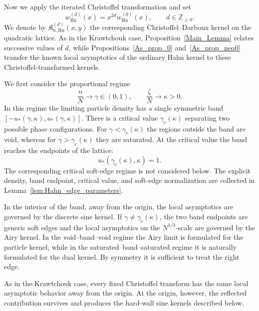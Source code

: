 \documentclass[reqno,11pt]{amsart}
\newcommand{\ZZ}{\mathbb{Z}}
\theoremstyle{plain}
\theoremstyle{definition}
\numberwithin{equation}{section}
\begin{document}
Now we apply the iterated Christoffel transformation and set
\[
w_{\mathrm{Hn}}^{(d)}(x) = x^{2d}w_{\mathrm{Hn}}^{(0)}(x),
\qquad
d\in\ZZ_{\geq0}.
\]
We denote by $\mathfrak K^{(d)}_{n,\mathrm{Hn}}(x,y)$ the corresponding Christoffel--Darboux kernel on the quadratic lattice. As in the Krawtchouk case, Proposition~\ref{Main_Lemma} relates successive values of $d$, while Propositions~\ref{As_prop_0} and~\ref{As_prop_neq0} transfer the known local asymptotics of the ordinary Hahn kernel to these Christoffel-transformed kernels.

We first consider the proportional regime
\[
\frac nN\longrightarrow\gamma\in(0,1),
\qquad
\frac{\zeta}{N}\longrightarrow\kappa>0.
\]
In this regime the limiting particle density has a single symmetric band $[-u_{\ast}(\gamma,\kappa),u_{\ast}(\gamma,\kappa)]$. There is a critical value $\gamma_{\mathrm c}(\kappa)$ separating two possible phase configurations. For $\gamma<\gamma_{\mathrm c}(\kappa)$ the regions outside the band are void, whereas for $\gamma>\gamma_{\mathrm c}(\kappa)$ they are saturated. At the critical value the band reaches the endpoints of the lattice:
\[
u_{\ast}(\gamma_{\mathrm c}(\kappa),\kappa)=1.
\]
The corresponding critical soft-edge regime is not considered below. The explicit density, band endpoint, critical value, and soft-edge normalization are collected in Lemma~\ref{lem:Hahn_edge_parameters}.

In the interior of the band, away from the origin, the local asymptotics are governed by the discrete sine kernel. If $\gamma\neq\gamma_{\mathrm c}(\kappa)$, the two band endpoints are generic soft edges and the local asymptotics on the $N^{1/3}$-scale are governed by the Airy kernel. In the void--band--void regime the Airy limit is formulated for the particle kernel, while in the saturated--band--saturated regime it is naturally formulated for the dual kernel. By symmetry it is sufficient to treat the right edge.

As in the Krawtchouk case, every fixed Christoffel transform has the same local asymptotic behavior away from the origin. At the origin, however, the reflected contribution survives and produces the hard-wall sine kernels described below.
\end{document}
